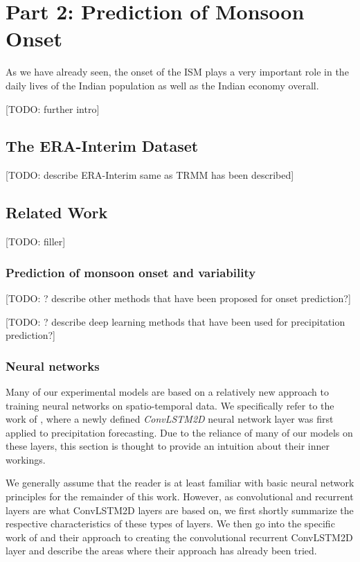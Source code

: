 \chapter{Part 2: Prediction of Monsoon Onset}
\label{c:part2}
As we have already seen, the onset of the ISM plays a very important role in the daily lives of the Indian population as well as the Indian economy overall.

[TODO: further intro]

\section{The ERA-Interim Dataset}
\label{st:era_interim}
[TODO: describe ERA-Interim same as TRMM has been described]

\section{Related Work}
[TODO: filler]

\subsection{Prediction of monsoon onset and variability}
\label{sst:related_prediction}
[TODO: ? describe other methods that have been proposed for onset prediction?]

[TODO: ? describe deep learning methods that have been used for precipitation prediction?]


\subsection{Neural networks}
\label{sst:neural_networks}
Many of our experimental models are based on a relatively new approach to training neural networks on spatio-temporal data. We specifically refer to the work of \citet{Shi.2015}, where a newly defined \textit{ConvLSTM2D} neural network layer was first applied to precipitation forecasting. Due to the reliance of many of our models on these layers, this section is thought to provide an intuition about their inner workings.

We generally assume that the reader is at least familiar with basic neural network principles for the remainder of this work. However, as convolutional and recurrent layers are what ConvLSTM2D layers are based on, we first shortly summarize the respective characteristics of these types of layers. We then go into the specific work of \citet{Shi.2015} and their approach to creating the convolutional recurrent ConvLSTM2D layer and describe the areas where their approach has already been tried.

